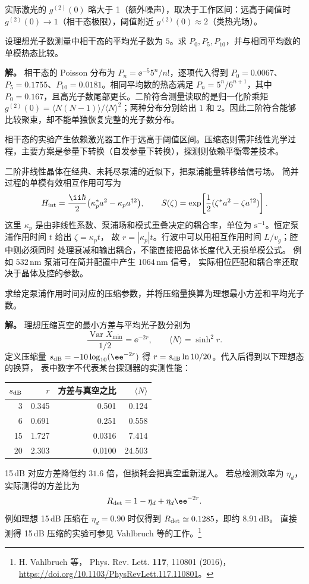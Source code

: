 实际激光的 \(g^{(2)}(0)\) 略大于 1（额外噪声），取决于工作区间：远高于阈值时 \(g^{(2)}(0)\to1\)（相干态极限），阈值附近 \(g^{(2)}(0)\approx2\)（类热光场）。

\begin{exbox}
设理想光子数测量中相干态的平均光子数为 $5$。求 $P_0,P_5,P_{10}$，并与相同平均数的单模热态比较。

\textbf{解。} 相干态的 Poisson 分布为 $P_n=\ee^{-5}5^n/n!$，逐项代入得到 $P_0=0.0067$、$P_5=0.1755$、$P_{10}=0.0181$。相同平均数的热态满足 $P_n=5^n/6^{n+1}$，其中 $P_0=0.167$，且高光子数尾部更长。二阶符合测量读取的是归一化阶乘矩 $g^{(2)}(0)=\langle N(N-1)\rangle/\langle N\rangle^2$；两种分布分别给出 $1$ 和 $2$。因此二阶符合能够比较聚束，却不能单独恢复完整的光子数分布。
\end{exbox}

相干态的实验产生依赖激光器工作于远高于阈值区间。压缩态则需非线性光学过程，主要方案是参量下转换（自发参量下转换），探测则依赖平衡零差技术。

\begin{example}[参量放大中的压缩量与光子数]
二阶非线性晶体在经典、未耗尽泵浦的近似下，把泵浦能量转移给信号场。
简并过程的单模有效相互作用可写为
\[
H_{\rm int}=\frac{\ii\hbar}{2}
\bigl(\kappa_p^*a^2-\kappa_p a^{\dagger2}\bigr),
\qquad S(\zeta)=\exp\!\left[\frac12(\zeta^*a^2-\zeta a^{\dagger2})\right].
\]
这里 $\kappa_p$ 是由非线性系数、泵浦场和模式重叠决定的耦合率，单位为
$\mathrm{s^{-1}}$。恒定泵浦作用时间 $t$ 给出 $\zeta=\kappa_p t$，
故 $r=|\kappa_p|t$。行波中可以用相互作用时间 $L/v_g$；腔中则必须同时
处理衰减和输出耦合，不能直接把晶体长度代入无损单模公式。
例如 $532\,\mathrm{nm}$ 泵浦可在简并配置中产生 $1064\,\mathrm{nm}$ 信号，
实际相位匹配和耦合率还取决于晶体及腔的参数。

求给定泵浦作用时间对应的压缩参数，并将压缩量换算为理想最小方差和平均光子数。

\textbf{解。} 理想压缩真空的最小方差与平均光子数分别为
\[
\frac{\operatorname{Var}X_{\min}}{1/2}=\ee^{-2r},\qquad
\langle N\rangle=\sinh^2r.
\]
定义压缩量 $s_{\rm dB}=-10\log_{10}(\ee^{-2r})$
得 $r=s_{\rm dB}\ln10/20$。代入后得到以下理想态的换算，
表中数字不代表某台探测器的实测性能：
\begin{center}
\begin{tabular}{rrrr}
\hline
$s_{\rm dB}$ & $r$ & 方差与真空之比 & $\langle N\rangle$ \\
\hline
3 & 0.345 & 0.501 & 0.124 \\
6 & 0.691 & 0.251 & 0.558 \\
15 & 1.727 & 0.0316 & 7.414 \\
20 & 2.303 & 0.0100 & 24.503 \\
\hline
\end{tabular}
\end{center}
15\,dB 对应方差降低约 $31.6$ 倍，但损耗会把真空重新混入。
若总检测效率为 $\eta_d$，实际测得的方差比为
\[
R_{\rm det}=1-\eta_d+\eta_d\ee^{-2r}.
\]
例如理想 15\,dB 压缩在 $\eta_d=0.90$ 时仅得到
$R_{\rm det}\simeq0.1285$，即约 $8.91$\,dB。
直接测得 15\,dB 压缩的实验可参见 Vahlbruch 等的工作。\footnote{H. Vahlbruch 等，
Phys. Rev. Lett. \textbf{117}, 110801 (2016)，
\url{https://doi.org/10.1103/PhysRevLett.117.110801}。}
\end{example}

